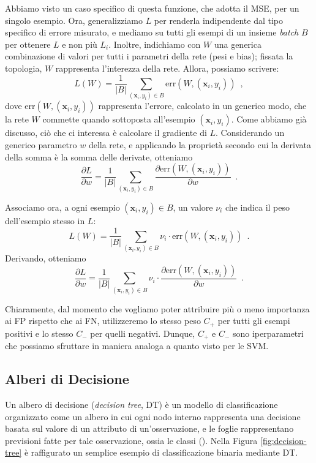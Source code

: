 Abbiamo visto un caso specifico di questa funzione, che adotta il MSE, per un singolo esempio. Ora, generalizziamo $L$ per renderla indipendente dal tipo specifico di errore misurato, e mediamo su tutti gli esempi di un insieme \textit{batch} $B$ per ottenere $L$ e non più $L_i$. Inoltre, indichiamo con $W$ una generica combinazione di valori per tutti i parametri della rete (pesi e bias); fissata la topologia, $W$ rappresenta l'interezza della rete. Allora, possiamo scrivere:
\begin{equation}
    L(W)= \frac{1}{|B|} \sum_{(\mathbf{x}_i, y_i) \in B} \text{err}(W,(\mathbf{x}_i, y_i)) \enspace ,
\end{equation}
dove $\text{err}(W,(\mathbf{x}_i, y_i))$ rappresenta l'errore, calcolato in un generico modo, che la rete $W$ commette quando sottoposta all'esempio $(\mathbf{x}_i, y_i)$.
Come abbiamo già discusso, ciò che ci interessa è calcolare il gradiente di $L$. Considerando un generico parametro $w$ della rete, e applicando la proprietà secondo cui la derivata della somma è la somma delle derivate, otteniamo
\begin{equation}
    \frac{\partial L}{\partial w} = \frac{1}{|B|} \sum_{(\mathbf{x}_i, y_i) \in B} \frac{\partial \text{err}(W,(\mathbf{x}_i, y_i))}{\partial w} \enspace .
\end{equation}

Associamo ora, a ogni esempio $(\mathbf{x}_i, y_i) \in B$, un valore $\nu_i$ che indica il peso dell'esempio stesso in $L$:
\begin{equation}
    L(W)= \frac{1}{|B|} \sum_{(\mathbf{x}_i, y_i) \in B} \nu_i \cdot \text{err}(W,(\mathbf{x}_i, y_i)) \enspace .
\end{equation}
Derivando, otteniamo
\begin{equation}
    \frac{\partial L}{\partial w} = \frac{1}{|B|} \sum_{(\mathbf{x}_i, y_i) \in B} \nu_i \cdot  \frac{\partial \text{err}(W,(\mathbf{x}_i, y_i))}{\partial w} \enspace .
\end{equation}

Chiaramente, dal momento che vogliamo poter attribuire più o meno importanza ai FP rispetto che ai FN, utilizzeremo lo stesso peso $C_+$ per tutti gli esempi positivi e lo stesso $C_-$ per quelli negativi. Dunque, $C_+$ e $C_-$ sono iperparametri che possiamo sfruttare in maniera analoga a quanto visto per le SVM.








\subsection{Alberi di Decisione}
\label{par:dt}
Un albero di decisione (\textit{decision tree}, DT) è un modello di classificazione organizzato come un albero in cui ogni nodo interno rappresenta una decisione basata sul valore di un attributo di un'osservazione, e le foglie rappresentano previsioni fatte per tale osservazione, ossia le classi (\cite{breiman1986dt}). Nella Figura \ref{fig:decision-tree} è raffigurato un semplice esempio di classificazione binaria mediante DT.

